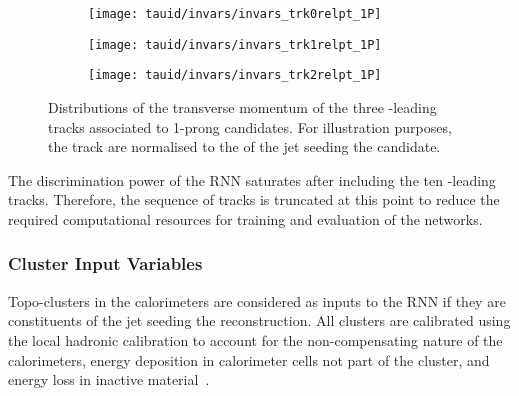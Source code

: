 \begin{figure}[htbp]
  \centering

  \begin{subfigure}{0.33\textwidth}
    \texttt{[image: tauid/invars/invars\_trk0relpt\_1P]}
    \subcaption{}%
    \label{fig:tauid_low_level_variables_track0}
  \end{subfigure}%
  \begin{subfigure}{0.33\textwidth}
    \texttt{[image: tauid/invars/invars\_trk1relpt\_1P]}
    \subcaption{}%
    \label{fig:tauid_low_level_variables_track1}
  \end{subfigure}%
  \begin{subfigure}{0.33\textwidth}
    \texttt{[image: tauid/invars/invars\_trk2relpt\_1P]}
    \subcaption{}%
    \label{fig:tauid_low_level_variables_track2}
  \end{subfigure}

  \caption[Distributions of the transverse momentum of the three \pT-leading
  tracks associated to 1-prong \tauhadvis candidates.]{Distributions of the
    transverse momentum of the three \pT-leading tracks associated to 1-prong
    \tauhadvis candidates. For illustration purposes, the track \pT are
    normalised to the \pT of the jet seeding the \tauhadvis candidate.}%
  \label{fig:tauid_low_level_variables_track}
\end{figure}

The discrimination power of the RNN \tauid saturates after including
the ten \pT-leading tracks. Therefore, the sequence of tracks is
truncated at this point to reduce the required computational resources
for training and evaluation of the networks.


\subsubsection{Cluster Input Variables}

Topo-clusters in the calorimeters are considered as inputs to the RNN \tauid if
they are constituents of the jet seeding the \tauhadvis reconstruction. All
clusters are calibrated using the local hadronic calibration to account for the
non-compensating nature of the calorimeters, energy deposition in calorimeter
cells not part of the cluster, and energy loss in inactive
material~\cite{PERF-2014-07}.

